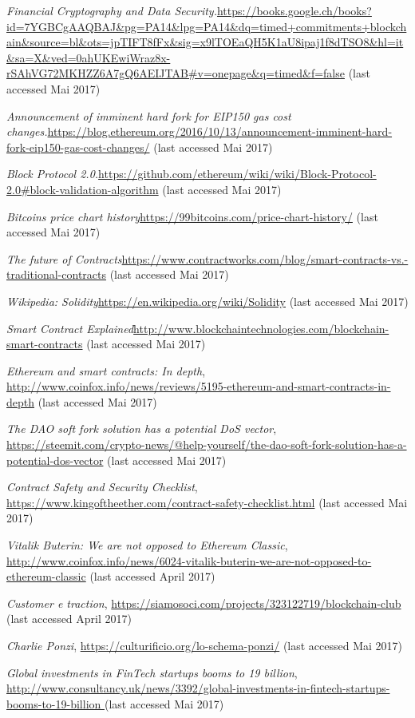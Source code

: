 \begin{thebibliography}{99}
\emph{Financial Cryptography and Data Security.}\url{https://books.google.ch/books?id=7YGBCgAAQBAJ&pg=PA14&lpg=PA14&dq=timed+commitments+blockchain&source=bl&ots=jpTIFT8fFx&sig=x9lTOEaQH5K1aU8ipaj1f8dTSO8&hl=it&sa=X&ved=0ahUKEwiWraz8x-rSAhVG72MKHZZ6A7gQ6AEIJTAB#v=onepage&q=timed&f=false} (last accessed Mai 2017)


\emph{Announcement of imminent hard fork for EIP150 gas cost changes.}\url{https://blog.ethereum.org/2016/10/13/announcement-imminent-hard-
fork-eip150-gas-cost-changes/} (last accessed Mai 2017)

\emph{Block Protocol 2.0.}\url{https://github.com/ethereum/wiki/wiki/Block-Protocol-2.0#block-validation-algorithm} (last accessed Mai 2017)

\emph{Bitcoins price chart history}\url{https://99bitcoins.com/price-chart-history/} (last accessed Mai 2017)

\emph{The future of Contracts}\url{https://www.contractworks.com/blog/smart-contracts-vs.-traditional-contracts} (last accessed Mai 2017)

\emph{Wikipedia: Solidity}\url{https://en.wikipedia.org/wiki/Solidity} (last accessed Mai 2017)

\emph{Smart Contract Explained}\url{http://www.blockchaintechnologies.com/blockchain-smart-contracts} (last accessed Mai 2017)

\emph{Ethereum and smart contracts: In depth}, \url{http://www.coinfox.info/news/reviews/5195-ethereum-and-smart-contracts-in-depth} (last accessed Mai 2017)

\emph{The DAO soft fork solution has a potential DoS vector}, \url{https://steemit.com/crypto-news/@help-yourself/the-dao-soft-fork-solution-has-a-potential-dos-vector} (last accessed Mai 2017)

\emph{Contract Safety and Security Checklist}, \url{https://www.kingoftheether.com/contract-safety-checklist.html} (last accessed Mai 2017)

\emph{Vitalik Buterin: We are not opposed to Ethereum Classic}, \url{http://www.coinfox.info/news/6024-vitalik-buterin-we-are-not-opposed-to-ethereum-classic} (last accessed April 2017)


\emph{Customer e traction}, \url{https://siamosoci.com/projects/323122719/blockchain-club} (last accessed April 2017)


\emph{Charlie Ponzi}, \url{https://culturificio.org/lo-schema-ponzi/} (last accessed Mai 2017)

\emph{Global investments in FinTech startups booms to 19 billion}, \url{http://www.consultancy.uk/news/3392/global-investments-in-fintech-startups-booms-to-19-billion
} (last accessed Mai 2017)



\end{thebibliography}
